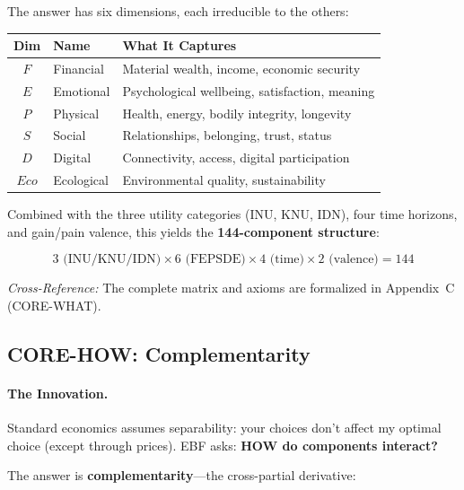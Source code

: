 The answer has six dimensions, each irreducible to the others:

\begin{center}
\renewcommand{\arraystretch}{1.2}
\begin{tabular}{@{}cll@{}}
\toprule
\textbf{Dim} & \textbf{Name} & \textbf{What It Captures} \\
\midrule
$F$ & Financial & Material wealth, income, economic security \\
$E$ & Emotional & Psychological wellbeing, satisfaction, meaning \\
$P$ & Physical & Health, energy, bodily integrity, longevity \\
$S$ & Social & Relationships, belonging, trust, status \\
$D$ & Digital & Connectivity, access, digital participation \\
$Eco$ & Ecological & Environmental quality, sustainability \\
\bottomrule
\end{tabular}
\end{center}

Combined with the three utility categories (INU, KNU, IDN), four time horizons,
and gain/pain valence, this yields the \textbf{144-component structure}:

\begin{equation}
3 \text{ (INU/KNU/IDN)} \times 6 \text{ (FEPSDE)} \times 4 \text{ (time)} \times 2 \text{ (valence)} = 144
\end{equation}

\textit{Cross-Reference:} The complete matrix and axioms are formalized in
Appendix~C (CORE-WHAT).

\subsection{CORE-HOW: Complementarity}
\label{sec:8c-how}

\paragraph{The Innovation.}
Standard economics assumes separability: your choices don't affect my optimal
choice (except through prices). EBF asks: \textbf{HOW do components interact?}

The answer is \textbf{complementarity}---the cross-partial derivative:

